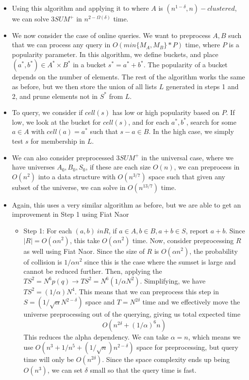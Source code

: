 \documentclass{article}
\begin{document}
\begin{itemize}
    \item Using this algorithm and applying it to where $A$ is $(n^{1-\delta},n)-clustered$, we can solve $3SUM^+$ in $n^{2-\Omega(\delta)}$ time.
    \item We now consider the case of online queries. We want to preprocess $A,B$ such that we can process any query in $O(min\{M_A, M_B\} * P)$ time, where $P$ is a popularity parameter. In this algorithm, we define buckets, and place $(a^*,b^*) \in A^* \times B^*$ in a bucket $s^* = a^* + b^*$. The popularity of a bucket depends on the number of elements. The rest of the algorithm works the same as before, but we then store the union of all lists $L$ generated in steps 1 and 2, and prune elements not in $S^*$ from $L$.
    \item To query, we consider if $cell(s)$ has low or high popularity based on $P$. If low, we look at the bucket for $cell(s)$, and for each $a^*, b^*$, search for some $a \in A$ with $cell(a) = a^*$ such that $s-a \in B$. In the high case, we simply test $s$ for membership in $L$.
    \item We can also consider preprocessed $3SUM^+$ in the universal case, where we have universes $A_0, B_0, S_0$, if these are each size $O(n)$, we can preprocess in $O(n^2)$ into a data structure with $O(n^{3/7})$ space such that given any subset of the universe, we can solve in $O(n^{13/7})$ time.
    \item Again, this uses a very similar algorithm as before, but we are able to get an improvement in Step 1 using Fiat Naor
    \begin{itemize}
        \item Step 1: For each $(a,b) \ in R$, if $a \in A, b\in B, a+b \in S$, report $a+b$. Since $|R| = O(\alpha n^2)$, this take $O(\alpha n^2)$ time. Now, consider preprocessing $R$ as well using Fiat Naor. Since the size of $R$ is $O(\alpha n^2)$, the probability of collision is $1/\alpha n^2$ since this is the case where the sumset is large and cannot be reduced further. Then, applying the $TS^2 = N^6p(q) \rightarrow TS^2 = N^6(1/\alpha N^2)$. Simplifying, we have $TS^2 = (1/\alpha)N^4$. This means that we can preprocess this step in $S = (1/\sqrt{\alpha} N ^{2-\delta})$ space and $T = N^{2\delta}$ time and we effectively move the universe preprocessing out of the querying, giving us total expected time
        $$O(n^{2\delta} + (1/\alpha)^6 n)$$
        This reduces the alpha dependency. We can take $\alpha = n$, which means we use $O(n^3 + 1/n^5 + (1/\sqrt{n})n^{2-\delta})$ space for preprocessing, but query time will only be $O(n^{2\delta})$. Since the space complexity ends up being $O(n^3)$, we can set $\delta$ small so that the query time is fast.
    \end{itemize}
\end{itemize}
\end{document}
